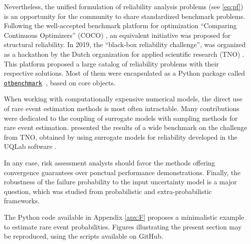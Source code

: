 Nevertheless, the unified formulation of reliability analysis problems (see \ref{eq:pf}) is an opportunity for the community to share standardized benchmark problems. 
Following the well-accepted benchmark platform for optimization ``Comparing Continuous Optimizers'' (COCO) \citep{hansen_2021_coco}, an equivalent initiative was proposed for structural reliability. 
In 2019, the ``black-box reliability challenge'', was organized as a hackathon by the Dutch organization for applied scientific research (TNO) \citep{rozsas_2019_bbrc}. 
This platform proposed a large catalog of reliability problems with their respective solutions. 
Most of them were encapsulated as a Python package called \href{https://github.com/mbaudin47/otbenchmark/}{\texttt{otbenchmark}}\footnotemark$~$ \citep{fekhari_baudin_2021}, based on core \ot objects.  



When working with computationally expensive numerical models, the direct use of rare event estimation methods is most often intractable. 
Many contributions were dedicated to the coupling of surrogate models with sampling methods for rare event estimation. 
\citet{moustapha_ss_2022} presented the results of a wide benchmark on the challenge from TNO, obtained by using surrogate models for reliability developed in the UQLab software \citep{marelli_2014_uqlab}.  

In any case, risk assessment analysts should favor the methods offering convergence guarantees over ponctual performance demonstrations. 
Finally, the robustness of the failure probability to the input uncertainty model is a major question, which was studied from probabilistic \citep{lemaitre_2015_PLI} and extra-probabilistic \citep{ajenjo_2022_structural_safety} frameworks. 


\begin{otexample}
    The Python code available in Appendix \ref{apx:F} proposes a minimalistic \ot example to estimate rare event probabilities. 
    Figures illustrating the present section may be reproduced, using the \ot scripts available on GitHub\footnotemark.  
\end{otexample}



